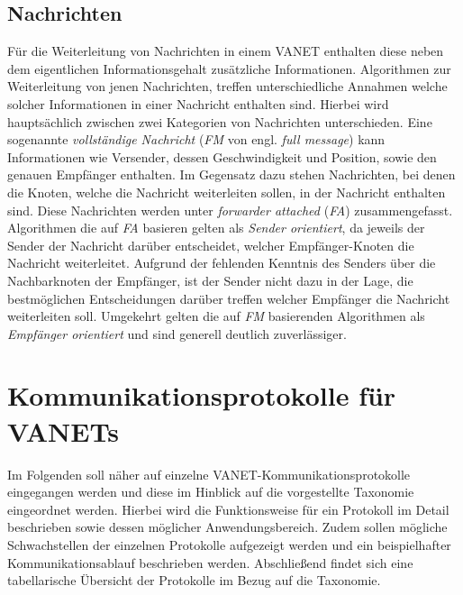 \documentclass[english,runningheads,a4paper]{llncs}[2018/03/10]
\begin{document}
\subsection{Nachrichten}
Für die Weiterleitung von Nachrichten in einem VANET enthalten diese neben dem eigentlichen Informationsgehalt zusätzliche Informationen.
Algorithmen zur Weiterleitung von jenen Nachrichten, treffen unterschiedliche Annahmen welche solcher Informationen in einer Nachricht enthalten sind.
Hierbei wird hauptsächlich zwischen zwei Kategorien von Nachrichten unterschieden.
Eine sogenannte \textit{vollständige Nachricht} (\textit{FM} von engl. \textit{full message}) kann Informationen wie Versender, dessen Geschwindigkeit und Position, sowie den genauen Empfänger enthalten.
Im Gegensatz dazu stehen Nachrichten, bei denen die Knoten, welche die Nachricht weiterleiten sollen, in der Nachricht enthalten sind.
Diese Nachrichten werden unter \textit{forwarder attached} (\textit{FA}) zusammengefasst.
Algorithmen die auf \textit{FA} basieren gelten als \textit{Sender orientiert}, da jeweils der Sender der Nachricht darüber entscheidet, welcher Empfänger-Knoten die Nachricht weiterleitet.
Aufgrund der fehlenden Kenntnis des Senders über die Nachbarknoten der Empfänger, ist der Sender nicht dazu in der Lage, die bestmöglichen Entscheidungen darüber treffen welcher Empfänger die Nachricht weiterleiten soll.
Umgekehrt gelten die auf \textit{FM} basierenden Algorithmen als \textit{Empfänger orientiert} und sind generell deutlich zuverlässiger\cite{conti2013mobile}.



\section{Kommunikationsprotokolle für VANETs}
\label{sec:protocols}
Im Folgenden soll näher auf einzelne VANET-Kommunikationsprotokolle eingegangen werden und diese im Hinblick auf die vorgestellte Taxonomie eingeordnet werden.
Hierbei wird die Funktionsweise für ein Protokoll im Detail beschrieben sowie dessen möglicher Anwendungsbereich.
Zudem sollen mögliche Schwachstellen der einzelnen Protokolle aufgezeigt werden und ein beispielhafter Kommunikationsablauf beschrieben werden.
Abschließend findet sich eine tabellarische Übersicht der Protokolle im Bezug auf die Taxonomie\cite{conti2013mobile}.
\end{document}
